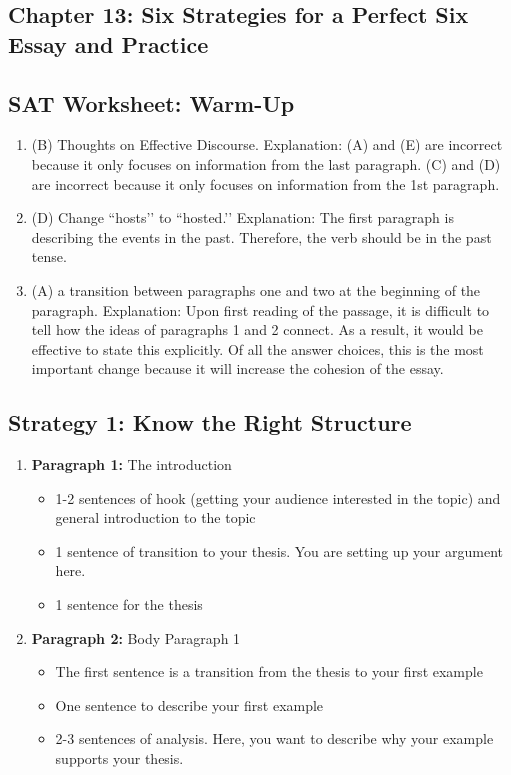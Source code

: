 \begin{enumerate}
\section{Chapter 13: Six Strategies for a Perfect Six Essay and Practice}

\subsection{SAT Worksheet: Warm-Up}

\begin{enumerate}
\item (B) Thoughts on Effective Discourse. Explanation: (A) and (E) are incorrect because it only focuses on information from the last paragraph. (C) and (D) are incorrect because it only focuses on information from the 1st paragraph.
\item (D) Change ``hosts’’ to ``hosted.’’ Explanation: The first paragraph is describing the events in the past. Therefore, the verb should be in the past tense. 
\item (A) a transition between paragraphs one and two at the beginning of the paragraph. Explanation: Upon first reading of the passage, it is difficult to tell how the ideas of paragraphs 1 and 2 connect. As a result, it would be effective to state this explicitly. Of all the answer choices, this is the most important change because it will increase the cohesion of the essay.
\end{enumerate}

\subsection{Strategy 1: Know the Right Structure}

\begin{enumerate}
\item \textbf{Paragraph 1:} The introduction

\begin{itemize}
\item 1-2 sentences of hook (getting your audience interested in the topic) and general introduction to the topic
\item 1 sentence of transition to your thesis. You are setting up your argument here.
\item 1 sentence for the thesis
\end{itemize}

\item \textbf{Paragraph 2:} Body Paragraph 1
\begin{itemize}
\item The first sentence is a transition from the thesis to your first example
\item One sentence to describe your first example
\item 2-3 sentences of analysis. Here, you want to describe why your example supports your thesis. 
\end{itemize}


\end{enumerate}
\end{enumerate}
